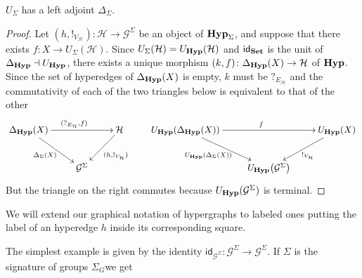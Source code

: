 \documentclass[runningheads,envcountsect]{llncs}
\newcommand{\catname}[1]{\textbf{\textup{#1}}}
\newcommand{\hyp}{\catname{Hyp}}
\newcommand{\id}[1]{\mathsf{id}_{#1}}
\begin{document}
\begin{proposition} $U_\Sigma$
	has a left adjoint $\Delta_\Sigma$.
\end{proposition}
\begin{proof}Let $(h, !_{V_\mathcal{H}})\colon \mathcal{H}\to \mathcal{G}^{\Sigma}$ be an object of $\hyp_{\Sigma}$, and suppose that there exists $f\colon X\to U_{\Sigma}(\mathcal{H})$. Since $U_{\Sigma}(\mathcal{H})=U_{\hyp}(\mathcal{H})$ and $\id{\catname{Set}}$ is the unit of $\Delta_\hyp \dashv U_{\hyp}$, there exists a unique morphism $(k,f)\colon \Delta_{\hyp}(X)\to \mathcal{H}$ of $\hyp$. Since the set of hyperedges of $\Delta_{\hyp}(X)$ is empty, $k$ must be $?_{E_\mathcal{H}}$ and the commutativity of each of the two triangles below is equivalent to that of the other
	\[\xymatrix{\Delta_\hyp(X) \ar[rr]^{(?_{E_\mathcal{H}}, f)} \ar[dr]_{\Delta_\Sigma(X)} && \mathcal{H} \ar[dl]^{(h, !_{V_\mathcal{H}})} & U_\hyp(\Delta_\hyp(X)) \ar[rr]^{f} \ar[dr]_{U_\hyp(\Delta_\Sigma(X))\hspace{10pt}} && U_\hyp(X) \ar[dl]^{!_{V_\mathcal{H}}}\\& \mathcal{G}^\Sigma &&&U_\hyp\hspace{-1.5pt}\left(\mathcal{G}^\Sigma\right)}\]
	But the triangle on the right commutes because $U_{\hyp}(\mathcal{G}^{\Sigma})$ is terminal.
\end{proof}

We will extend our graphical notation of hypergraphs to labeled ones putting the label of an hyperedge $h$ inside its corresponding square.
\begin{example}\label{lab_1}
	The simplest example is given by the identity $\id{\mathcal{G}^\Sigma}\colon \mathcal{G}^\Sigma\rightarrow \mathcal{G}^{\Sigma}$. If $\Sigma$ is the signature of groups $\Sigma_G$we get 
	\begin{center}
	\end{center}
\end{example}
\end{document}
